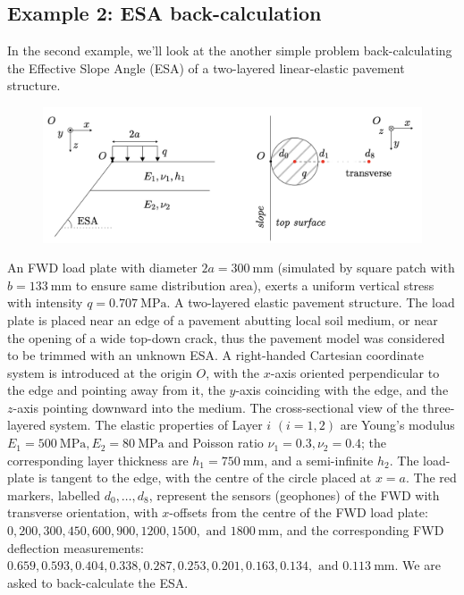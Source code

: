 \documentclass{article}
\begin{document}
\subsection{Example 2: ESA back-calculation}
In the second example, we'll look at the another simple problem back-calculating the Effective Slope Angle (ESA) of a two-layered linear-elastic pavement structure.
\begin{figure}[h]
    \centering
    \includegraphics[width=0.7\linewidth]{figures/ex2}
    \label{fig:ex2}
\end{figure}
\begin{question}
    An FWD load plate with diameter \( 2a = \SI{300}{\milli\meter} \) (simulated by square patch with \( b = \SI{133}{\milli\meter} \) to ensure same distribution area), exerts a uniform vertical stress with intensity \( q = \SI{0.707}{\mega\pascal} \). A two-layered elastic pavement structure. The load plate is placed near an edge of a pavement abutting local soil medium, or near the opening of a wide top-down crack, thus the pavement model was considered to be trimmed with an unknown ESA. A right-handed Cartesian coordinate system is introduced at the origin \( O \), with the \( x \)-axis oriented perpendicular to the edge and pointing away from it, the \( y \)-axis coinciding with the edge, and the \( z \)-axis pointing downward into the medium. The cross-sectional view of the three-layered system. The elastic properties of Layer \( i \) \( (i=1,2) \) are Young's modulus \( E_1 = \SI{500}{\mega\pascal}, E_2 = \SI{80}{\mega\pascal} \) and Poisson ratio \( \nu_1 = 0.3, \nu_2 = 0.4 \); the corresponding layer thickness are \( h_1 = \SI{750}{\milli\meter} \), and a semi-infinite \( h_2 \). The load-plate is tangent to the edge, with the centre of the circle placed at \( x = a \). The red markers, labelled \( d_0, \ldots, d_8 \), represent the sensors (geophones) of the FWD with transverse orientation, with \( x \)-offsets from the centre of the FWD load plate: \( 0, 200, 300, 450, 600, 900, 1200, 1500, \text{ and } \SI{1800}{\milli\meter} \), and the corresponding FWD deflection measurements: \( 0.659, 0.593, 0.404, 0.338, 0.287, 0.253, 0.201, 0.163, 0.134, \text{ and } \SI{0.113}{\milli\meter} \). We are asked to back-calculate the ESA. 
\end{question}
\end{document}
